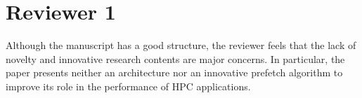 \documentclass{article}
\begin{document}
       
       
        





        


        
\section*{Reviewer 1}

Although the manuscript has a good structure, the reviewer feels that the lack of novelty and innovative research contents are major concerns. In particular, the paper presents neither an architecture nor an innovative prefetch algorithm to improve its role in the performance of HPC applications. 
\end{document}
